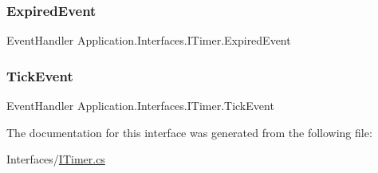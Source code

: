 \subsubsection{\texorpdfstring{Expired\+Event}{ExpiredEvent}}
{\footnotesize\ttfamily Event\+Handler Application.\+Interfaces.\+I\+Timer.\+Expired\+Event}

\mbox{\label{interface_application_1_1_interfaces_1_1_i_timer_af8955cf4dc8aa8183653cb62b713defd}} 
\subsubsection{\texorpdfstring{Tick\+Event}{TickEvent}}
{\footnotesize\ttfamily Event\+Handler Application.\+Interfaces.\+I\+Timer.\+Tick\+Event}



The documentation for this interface was generated from the following file\+:\begin{DoxyCompactItemize}
\item 
Interfaces/\mbox{\hyperlink{_i_timer_8cs}{I\+Timer.\+cs}}\end{DoxyCompactItemize}
